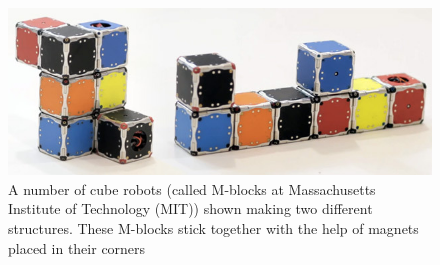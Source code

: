 \begin{figure}[H] 
	\centering
	\includegraphics[scale=0.4]{figures/m-blocks}
	\caption{A number of cube robots (called M-blocks at Massachusetts Institute of Technology (MIT)) shown making two different structures. These M-blocks stick together with the help of magnets placed in their corners\cite{LRosen}}
	\label{MBlocksExample}
\end{figure} 




